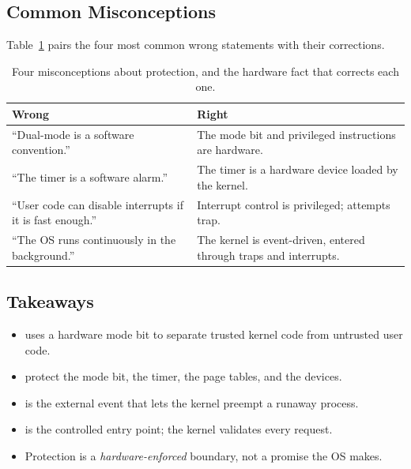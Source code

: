 \documentclass[11pt]{article}
\begin{document}
\subsection{Common Misconceptions}

Table~\ref{tab:misconceptions} pairs the four most common wrong statements with
their corrections.

\begin{table}[h]
\centering
\small
\renewcommand{\arraystretch}{1.3}
\begin{tabular}{p{}p{}}
\toprule
\textbf{Wrong} & \textbf{Right} \\
\midrule
``Dual-mode is a software convention.'' &
The mode bit and privileged instructions are hardware. \\
``The timer is a software alarm.'' &
The timer is a hardware device loaded by the kernel. \\
``User code can disable interrupts if it is fast enough.'' &
Interrupt control is privileged; attempts trap. \\
``The OS runs continuously in the background.'' &
The kernel is event-driven, entered through traps and interrupts. \\
\bottomrule
\end{tabular}
\caption{Four misconceptions about protection, and the hardware fact that
corrects each one.}
\label{tab:misconceptions}
\end{table}

\subsection{Takeaways}

\begin{itemize}
  \item {} uses a hardware mode bit to separate trusted
    kernel code from untrusted user code.
  \item {} protect the mode bit, the timer, the page
    tables, and the devices.
  \item {} is the external event that lets the kernel preempt a
    runaway process.
  \item {} is the controlled entry point; the kernel
    validates every request.
  \item Protection is a \emph{hardware-enforced} boundary, not a promise the OS
    makes.
\end{itemize}
\end{document}
